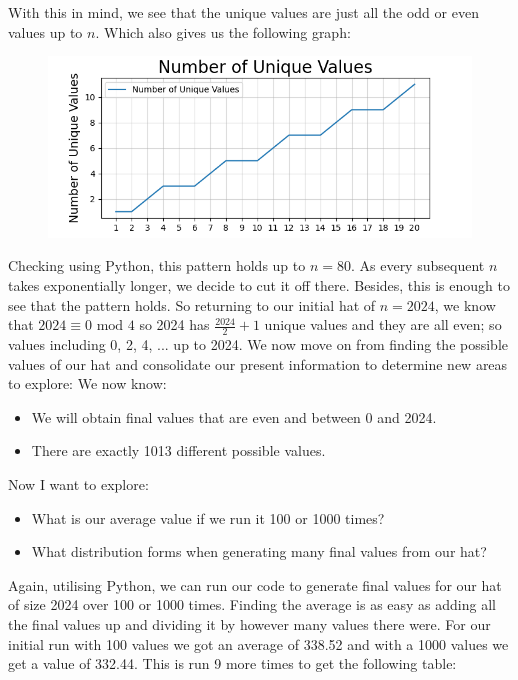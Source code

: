 \documentclass[11pt]{article}
\newcommand{\keywordfont}{\textsc}
\newcommand{\keyword}[1]{%
  \marginpar{\raggedright\small\keywordfont{#1}}}
\begin{document}
With this in mind, we see that the unique values are just all the odd or even values up to $n$. Which also gives us the following graph:

\begin{figure}[h] 
   \centering
   \includegraphics[width=5in]{graph.png}
   \label{myfig}
\end{figure}

Checking \keyword{Check} using Python, this pattern holds up to $n=80$. As every subsequent $n$ takes exponentially longer, we decide to cut it off there. Besides, this is enough to see that the pattern holds. So returning to our initial hat of $n=2024$, we know that $2024 \equiv 0 \text{ mod } 4$ so 2024 has $\frac{2024}{2} + 1$ unique values and they are all even; so values including 0, 2, 4, ... up to 2024. We now move on from finding the possible values of our hat and consolidate our present \keyword{Mini Re-Entry} information to determine new areas to explore:
We now know:
\begin{itemize}
    \item We will obtain final values that are even and between 0 and 2024.
    \item There are exactly 1013 different possible values.
\end{itemize}
Now I want to\keyword{I want} explore:
\begin{itemize}
    \item What is our average value if we run it 100 or 1000 times?
    \item What distribution forms when generating many final values from our hat?
\end{itemize}

Again, utilising Python, we can run our code to generate final values for our hat of size 2024 over 100 or 1000 times. Finding the average is as easy as adding all the final values up and dividing it by however many values there were. For \keyword{Try} our initial run with 100 values we got an average of 338.52 and with a 1000 values we get a value of 332.44. This is run 9 more times to get the following table:
\end{document}
